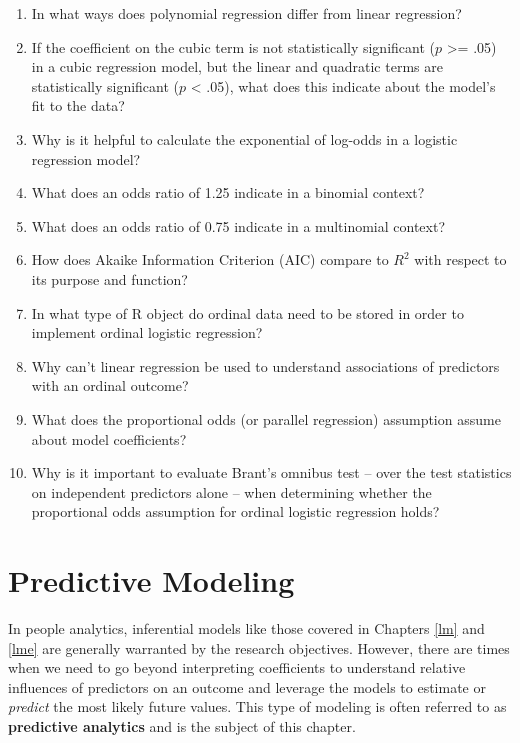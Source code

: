 \documentclass[
]{book}
\begin{document}
\begin{enumerate}
\def\labelenumi{\arabic{enumi}.}
\item
  In what ways does polynomial regression differ from linear regression?
\item
  If the coefficient on the cubic term is not statistically significant (\(p\) \textgreater= .05) in a cubic regression model, but the linear and quadratic terms are statistically significant (\(p\) \textless{} .05), what does this indicate about the model's fit to the data?
\item
  Why is it helpful to calculate the exponential of log-odds in a logistic regression model?
\item
  What does an odds ratio of 1.25 indicate in a binomial context?
\item
  What does an odds ratio of 0.75 indicate in a multinomial context?
\item
  How does Akaike Information Criterion (AIC) compare to \(R^2\) with respect to its purpose and function?
\item
  In what type of R object do ordinal data need to be stored in order to implement ordinal logistic regression?
\item
  Why can't linear regression be used to understand associations of predictors with an ordinal outcome?
\item
  What does the proportional odds (or parallel regression) assumption assume about model coefficients?
\item
  Why is it important to evaluate Brant's omnibus test -- over the test statistics on independent predictors alone -- when determining whether the proportional odds assumption for ordinal logistic regression holds?
\end{enumerate}

\hypertarget{pred-mod}{%
\chapter{Predictive Modeling}\label{pred-mod}}

In people analytics, inferential models like those covered in Chapters \ref{lm} and \ref{lme} are generally warranted by the research objectives. However, there are times when we need to go beyond interpreting coefficients to understand relative influences of predictors on an outcome and leverage the models to estimate or \emph{predict} the most likely future values. This type of modeling is often referred to as \textbf{predictive analytics} and is the subject of this chapter.
\end{document}
